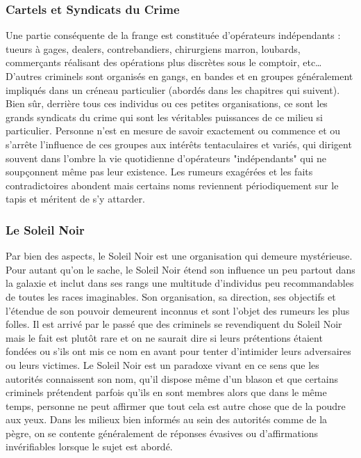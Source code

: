 \documentclass[twoside]{article}
\begin{document}
\subsubsection{Cartels et Syndicats du Crime}
Une partie conséquente de la frange est constituée d'opérateurs indépendants : tueurs à gages, dealers, contrebandiers, chirurgiens marron, loubards, commerçants réalisant des opérations plus discrètes sous le comptoir, etc\ldots D’autres criminels sont organisés en gangs, en bandes et en groupes généralement impliqués dans un créneau particulier (abordés dans les chapitres qui suivent).
Bien sûr, derrière tous ces individus ou ces petites organisations, ce sont les grands syndicats du crime qui sont les véritables puissances de ce milieu si particulier. Personne n'est en mesure de savoir exactement ou commence et ou s'arrête l'influence de ces groupes aux intérêts tentaculaires et variés, qui dirigent souvent dans l'ombre la vie quotidienne d'opérateurs "indépendants" qui ne soupçonnent même pas leur existence. Les rumeurs exagérées et les faits contradictoires abondent mais certains noms reviennent périodiquement sur le tapis et méritent de s'y attarder.

\subsubsection{Le Soleil Noir}
Par bien des aspects, le Soleil Noir est une organisation qui demeure mystérieuse. Pour autant qu'on le sache, le Soleil Noir étend son influence un peu partout dans la galaxie et inclut dans ses rangs une multitude d'individus peu recommandables de toutes les races imaginables. Son organisation, sa direction, ses objectifs et l'étendue de son pouvoir demeurent inconnus et sont l'objet des rumeurs les plus folles. Il est arrivé par le passé que des criminels se revendiquent du Soleil Noir mais le fait est plutôt rare et on ne saurait dire si leurs prétentions étaient fondées ou s'ils ont mis ce nom en avant pour tenter d'intimider leurs adversaires ou leurs victimes. Le Soleil Noir est un paradoxe vivant en ce sens que les autorités connaissent son nom, qu'il dispose même d'un blason et que certains criminels prétendent parfois qu'ils en sont membres alors que dans le même temps, personne ne peut affirmer que tout cela est autre chose que de la poudre aux yeux. Dans les milieux bien informés au sein des autorités comme de la pègre, on se contente généralement de réponses évasives ou d'affirmations invérifiables lorsque le sujet est abordé.\\
\end{document}

